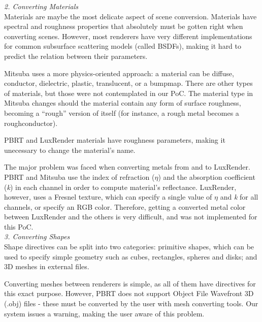 
\textit{2. Converting Materials} \\
Materials are maybe the most delicate aspect of scene conversion. Materials have
spectral and roughness properties that absolutely must be gotten right when
converting scenes. However, most renderers have very different implementations
for common subsurface scattering models (called BSDFs), making it hard to
predict the relation between their parameters.

Mitsuba uses a more physics-oriented approach: a material can be diffuse,
conductor, dielectric, plastic, translucent, or a bumpmap.
There are other types of materials, but those were not contemplated in our PoC.
The material type in Mitsuba changes should the material contain any form of
surface roughness, becoming a ``rough'' version of itself (for instance, a rough
metal becomes a roughconductor).

PBRT and LuxRender materials have roughness parameters, making it unecessary to
change the material's name.

The major problem was faced when converting metals from and to LuxRender. PBRT 
and Mitsuba use the index of refraction ($\eta$) and the absorption 
coefficient (\textit{k}) in each channel in order to compute material's 
reflectance. LuxRender, however, uses a Fresnel texture, which can specify a 
single value of $\eta$ and \textit{k} for all channels, or specify an RGB 
color. Therefore, getting a converted metal color between LuxRender and the 
others is very difficult, and was not implemented for this PoC. \\

\textit{3. Converting Shapes} \\
Shape directives can be split into two categories: primitive shapes, which can
be used to specify simple geometry such as cubes, rectangles, spheres and disks;
and 3D meshes in external files.

Converting meshes between renderers is simple, as all of them have directives
for this exact purpose. However, PBRT does not support Object File Wavefront 3D
(.obj) files - these must be converted by the user with mesh converting tools.
Our system issues a warning, making the user aware of this problem.

